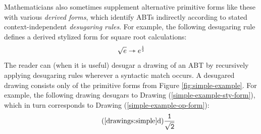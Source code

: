 Mathematicians also sometimes supplement alternative primitive forms like these with various \emph{derived forms}, which  identify ABTs indirectly according to stated context-independent \emph{desugaring rules}. For example, the following desugaring rule defines a derived stylized form for square root calculations:
\begin{equation}\label{rule:simplelang-sqrt}
\sqrt{e} \rightarrowtriangle e^{\frac{\numintro{1}}{\numintro{2}}}
\end{equation}
The reader can (when it is useful) desugar a drawing of an ABT by recursively applying desugaring rules wherever a syntactic match occurs. A desugared drawing consists only of the {primitive forms} from Figure \ref{fig:simple-example}. 
For example, the following drawing desugars to Drawing (\ref{simple-example-sty-form}), which in turn corresponds to Drawing (\ref{simple-example-op-form}):
\begin{equation*}\tag{\ref*{drawings:simple}d}
\frac{\numintro{1}}{\sqrt{\numintro{2}}}
\end{equation*}


